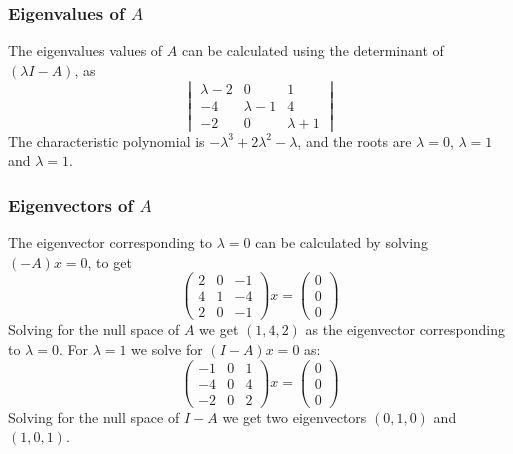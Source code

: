 \documentclass{article}[12pt]
\begin{document}
\subsubsection{Eigenvalues of $A$}
The eigenvalues values of $A$ can be calculated using the determinant
of $(\lambda I-A)$, as
\[
\begin{vmatrix}
\lambda-2 & 0 & 1\\
-4 & \lambda-1 & 4 \\
-2 & 0 & \lambda+1
\end{vmatrix}
\]
The characteristic polynomial is $-\lambda^3+2\lambda^2-\lambda$, and
the roots are $\lambda=0$, $\lambda=1$ and $\lambda=1$.

\subsubsection{Eigenvectors of $A$}
The eigenvector corresponding to $\lambda=0$ can be calculated by
solving $(-A)x=0$, to get
\[
\begin{pmatrix} 2 & 0 & -1 \\ 4 & 1 & -4 \\ 2 & 0 & -1 \end{pmatrix}x
= \begin{pmatrix} 0 \\ 0 \\ 0 \end{pmatrix}
\]
Solving for the null space of $A$ we get $(1,4,2)$ as the eigenvector
corresponding to $\lambda=0$. For $\lambda=1$ we solve for
$(I - A)x=0$ as:
\[
\begin{pmatrix} -1 & 0 & 1 \\ -4 & 0 & 4 \\ -2 & 0 & 2 \end{pmatrix}x
= \begin{pmatrix} 0 \\ 0 \\ 0 \end{pmatrix}
\]
Solving for the null space of $I-A$ we get two eigenvectors
$(0,1,0)$ and $(1,0,1)$.
\end{document}
